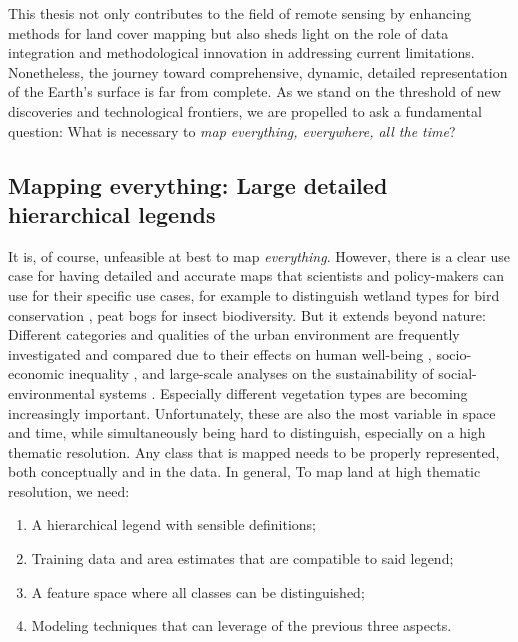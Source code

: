     This thesis not only contributes to the field of remote sensing by enhancing methods for land cover mapping but also sheds light on the role of data integration and methodological innovation in addressing current limitations. Nonetheless, the journey toward comprehensive, dynamic, detailed representation of the Earth's surface is far from complete. As we stand on the threshold of new discoveries and technological frontiers, we are propelled to ask a fundamental question: What is necessary to \textit{map everything, everywhere, all the time}?

    \subsection{Mapping everything: Large detailed hierarchical legends}

        It is, of course, unfeasible at best to map \textit{everything}. However, there is a clear use case for having detailed and accurate maps that scientists and policy-makers can use for their specific use cases, for example to distinguish wetland types for bird conservation \citep{fan2021function}, peat bogs \citep{spitzer2006insect} for insect biodiversity. But it extends beyond nature: Different categories and qualities of the urban environment are frequently investigated and compared due to their effects on human well-being \citep{krekel2016greener}, socio-economic inequality \citep{tian2024urban}, and large-scale analyses on the sustainability of social-environmental systems \citep{chen2022sustainability}. Especially different vegetation types are becoming increasingly important. Unfortunately, these are also the most variable in space and time, while simultaneously being hard to distinguish, especially on a high thematic resolution. Any class that is mapped needs to be properly represented, both conceptually and in the data. In general, To map land at high thematic resolution, we need:
        \begin{enumerate}
            \item A hierarchical legend with sensible definitions;
            \item Training data and area estimates that are compatible to said legend;
            \item A feature space where all classes can be distinguished;
            \item Modeling techniques that can leverage of the previous three aspects.
        \end{enumerate}

